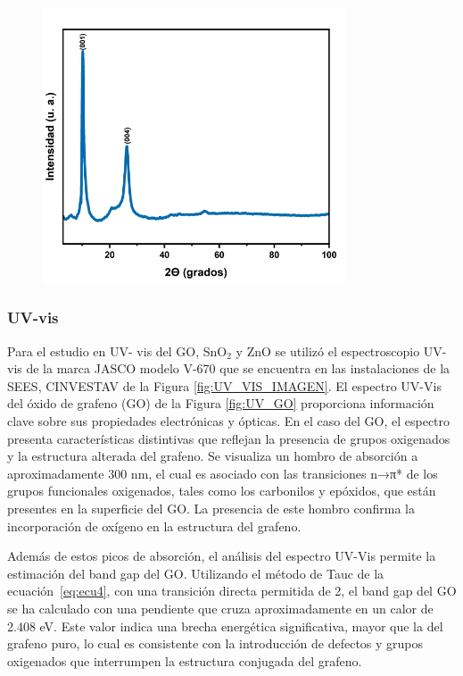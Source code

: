 \documentclass[12pt]{article}
\begin{document}
\begin{figure}[H]
    	   \begin{center}
     	  	\includegraphics[width = 0.8\textwidth]{Imagenes/GO_1_2.png}
    	   \end{center} 
        \end{figure}
\subsubsection{UV-vis}
Para el estudio en UV- vis del GO, SnO$\displaystyle _{2}$ y ZnO se utilizó el espectroscopio UV-vis de la marca JASCO modelo V-670 que se encuentra en las instalaciones de la SEES, CINVESTAV de la Figura \ref{fig:UV_VIS_IMAGEN}.
El espectro UV-Vis del óxido de grafeno (GO) de la Figura \ref{fig:UV_GO} proporciona información clave sobre sus propiedades electrónicas y ópticas. En el caso del GO, el espectro presenta características distintivas que reflejan la presencia de grupos oxigenados y la estructura alterada del grafeno.\vspace{1em} %
Se visualiza un hombro de absorción a aproximadamente 300 nm, el cual es asociado con las transiciones n→π* de los grupos funcionales oxigenados, tales como los carbonilos y epóxidos, que están presentes en la superficie del GO. La presencia de este hombro confirma la incorporación de oxígeno en la estructura del grafeno.\vspace{1em} %

Además de estos picos de absorción, el análisis del espectro UV-Vis permite la estimación del band gap del GO. Utilizando el método de Tauc de la ecuación~\ref{eq:ecu4}, con una transición directa permitida de 2, el band gap del GO se ha calculado con una pendiente que cruza aproximadamente en un calor de 2.408 eV. Este valor indica una brecha energética significativa, mayor que la del grafeno puro, lo cual es consistente con la introducción de defectos y grupos oxigenados que interrumpen la estructura conjugada del grafeno.\vspace{1em} %
\end{document}

